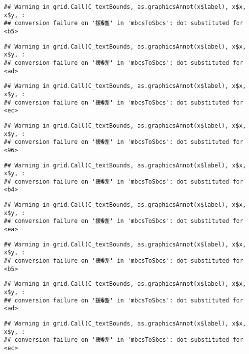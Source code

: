 \documentclass[
]{article}
\begin{document}
\begin{verbatim}
## Warning in grid.Call(C_textBounds, as.graphicsAnnot(x$label), x$x, x$y, :
## conversion failure on '援�뼱' in 'mbcsToSbcs': dot substituted for <b5>
\end{verbatim}

\begin{verbatim}
## Warning in grid.Call(C_textBounds, as.graphicsAnnot(x$label), x$x, x$y, :
## conversion failure on '援�뼱' in 'mbcsToSbcs': dot substituted for <ad>
\end{verbatim}

\begin{verbatim}
## Warning in grid.Call(C_textBounds, as.graphicsAnnot(x$label), x$x, x$y, :
## conversion failure on '援�뼱' in 'mbcsToSbcs': dot substituted for <ec>
\end{verbatim}

\begin{verbatim}
## Warning in grid.Call(C_textBounds, as.graphicsAnnot(x$label), x$x, x$y, :
## conversion failure on '援�뼱' in 'mbcsToSbcs': dot substituted for <96>
\end{verbatim}

\begin{verbatim}
## Warning in grid.Call(C_textBounds, as.graphicsAnnot(x$label), x$x, x$y, :
## conversion failure on '援�뼱' in 'mbcsToSbcs': dot substituted for <b4>
\end{verbatim}

\begin{verbatim}
## Warning in grid.Call(C_textBounds, as.graphicsAnnot(x$label), x$x, x$y, :
## conversion failure on '援�뼱' in 'mbcsToSbcs': dot substituted for <ea>
\end{verbatim}

\begin{verbatim}
## Warning in grid.Call(C_textBounds, as.graphicsAnnot(x$label), x$x, x$y, :
## conversion failure on '援�뼱' in 'mbcsToSbcs': dot substituted for <b5>
\end{verbatim}

\begin{verbatim}
## Warning in grid.Call(C_textBounds, as.graphicsAnnot(x$label), x$x, x$y, :
## conversion failure on '援�뼱' in 'mbcsToSbcs': dot substituted for <ad>
\end{verbatim}

\begin{verbatim}
## Warning in grid.Call(C_textBounds, as.graphicsAnnot(x$label), x$x, x$y, :
## conversion failure on '援�뼱' in 'mbcsToSbcs': dot substituted for <ec>
\end{verbatim}
\end{document}
